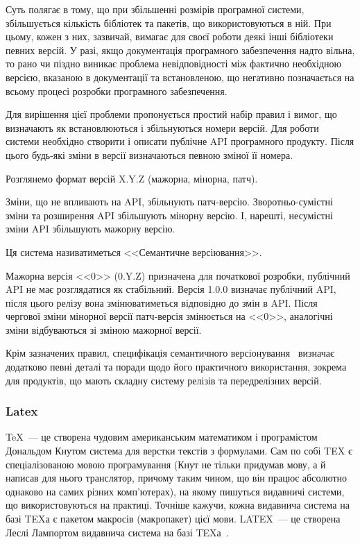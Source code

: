 Суть полягає в тому, що при збільшенні розмірів програмної системи, збільшується кількість бібліотек та пакетів, що використовуються в ній. При цьому, кожен з них, зазвичай, вимагає для своєї роботи деякі інші бібліотеки певних версій. У разі, якщо документація програмного забезпечення надто вільна, то рано чи піздно виникає проблема невідповідності між фактично необхідною версією, вказаною в документації та встановленою, що негативно позначається на всьому процесі розробки програмного забезпечення.

Для вирішення цієї проблеми пропонується простий набір правил і вимог, що визначають як встановлюються і збільнуються номери версій. Для роботи системи необхідно створити і описати публічне API програмного продукту. Після цього будь-які зміни в версії визначаються певною зміної її номера.

Розглянемо формат версій X.Y.Z (мажорна, мінорна, патч).

Зміни, що не впливають на API, збільнують патч-версію. Зворотньо-сумістні зміни та розширення API збільшують мінорну версію. І, нарешті, несумістні зміни API збільшують мажорну версію.

Ця система називатиметься <<Семантичне версіювання>>.

Мажорна версія <<0>> (0.Y.Z) призначена для початкової розробки, публічний API не має розглядатися як стабільний. Версія 1.0.0 визначає публічний API, після цього релізу вона змінюватиметься відповідно до змін в API. Після чергової зміни мінорної версії патч-версія змінюється на <<0>>, аналогічні зміни відбуваються зі зміною мажорної версії.

Крім зазначених правил, специфікація семантичного версіонування~\cite{semver} визначає додатково певні деталі та поради щодо його практичного використання, зокрема для продуктів, що мають складну систему релізів та передрелізних версій.

\subsubsection{Latex} \label{subsub:latex}

\TeX~--- це створена чудовим американським математиком і програмістом Дональдом Кнутом система для верстки текстів з формулами. Сам по собі TEX є спеціалізованою мовою програмування (Кнут не тільки придумав мову, а й написав для нього транслятор, причому таким чином, що він працює абсолютно однаково на самих різних комп'ютерах), на якому пишуться видавничі системи, що використовуються на практиці. Точніше кажучи, кожна видавнича система на базі TEXа є пакетом макросів (макропакет) цієї мови. LATEX~--- це створена Леслі Лампортом видавнича система на базі TEXа~\cite{львовский2003latex}.

